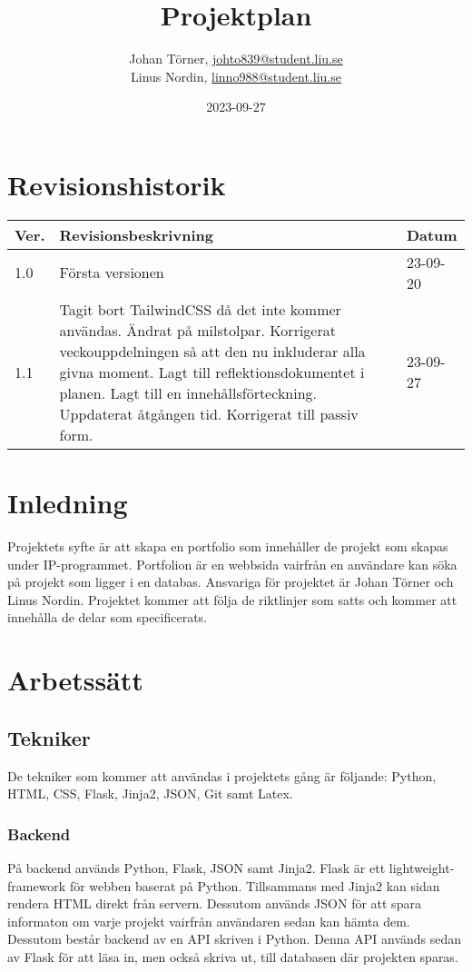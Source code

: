 \documentclass{TDP003mall}
\author{Johan Törner, \url{johto839@student.liu.se}\\
  Linus Nordin, \url{linno988@student.liu.se}}
\title{Projektplan}
\date{2023-09-27}
\begin{document}
\projectpage
\section{Revisionshistorik}
\begin{table}[!h]
\begin{tabularx}{\linewidth}{|l|X|l|}
\hline
Ver. & Revisionsbeskrivning & Datum \\\hline
1.0 & Första versionen & 23-09-20\\\hline
1.1 & Tagit bort TailwindCSS då det inte kommer användas.  Ändrat på milstolpar. Korrigerat veckouppdelningen så att den nu inkluderar alla givna moment. Lagt till reflektionsdokumentet i planen. Lagt till en innehållsförteckning. Uppdaterat åtgången tid. Korrigerat till passiv form.& 23-09-27\\\hline
\end{tabularx}
\end{table}
\pagebreak

\tableofcontents

\pagebreak
\section{Inledning}
Projektets syfte är att skapa en portfolio som innehåller de projekt som skapas under IP-programmet. 
Portfolion är en webbsida vairfrån en användare kan söka på projekt som ligger i en databas. Ansvariga för projektet 
är Johan Törner och Linus Nordin. Projektet kommer att följa de riktlinjer som satts och kommer att innehålla de delar
som specificerats. 


\section{Arbetssätt}

\subsection{Tekniker}
De tekniker som kommer att användas i projektets gång är följande: Python, HTML, CSS, Flask, Jinja2, JSON, Git samt Latex. 

\subsubsection{Backend}
På backend används Python, Flask, JSON samt Jinja2. Flask är ett lightweight-framework för webben baserat på Python.
Tillsammans med Jinja2 kan sidan rendera HTML direkt från servern. Dessutom används JSON för att spara informaton om varje projekt vairfrån
användaren sedan kan hämta dem. Dessutom består backend av en API skriven i Python.
Denna API används sedan av Flask för att läsa in, men också skriva ut, till databasen där
projekten sparas. 
\end{document}
